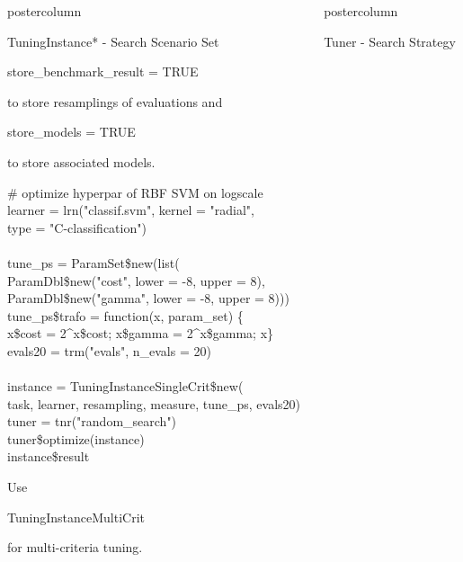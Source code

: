 \documentclass{beamer}
\newlength{\columnheight} %
\newcommand{\codeinline}[1]{\begin{codeboxinline}#1\end{codeboxinline}}
\begin{document}
\begin{frame}[fragile]{}
\begin{columns}
\begin{column}{.245\textwidth}
\begin{beamercolorbox}[center]{postercolumn}
\begin{minipage}{.98\textwidth}
{\begin{myblock}{TuningInstance* - Search Scenario}
							Set \codeinline{store\_benchmark\_result = TRUE} to store resamplings of evaluations and \codeinline{store\_models = TRUE} to store associated models.\\
							\begin{codeboxexample}
								{\scriptsize
									\# optimize hyperpar of RBF SVM on logscale\\
									learner = lrn("classif.svm", kernel = "radial",\\
									\hspace*{1ex} type = "C-classification")\\
									\\
									tune\_ps = ParamSet\$new(list(\\
									\hspace*{1ex} ParamDbl\$new("cost", lower = -8, upper = 8),\\
									\hspace*{1ex} ParamDbl\$new("gamma", lower = -8, upper = 8)))\\
									tune\_ps\$trafo = function(x, param\_set) \{\\
									\hspace*{1ex} x\$cost = 2\textasciicircum x\$cost; x\$gamma = 2\textasciicircum x\$gamma; x\}\\
									evals20 = trm("evals", n\_evals = 20)\\
									\\
									instance = TuningInstanceSingleCrit\$new(\\
									\hspace*{1ex} task, learner, resampling, measure, tune\_ps, evals20)\\
									tuner = tnr("random\_search")\\
									tuner\$optimize(instance)\\
									instance\$result}
							\end{codeboxexample}
							Use \codeinline{TuningInstanceMultiCrit} for multi-criteria tuning.
						\end{myblock}
						\vfill}
				\end{minipage}
			\end{beamercolorbox}
		\end{column}
		\begin{column}{.245\textwidth}
			\begin{beamercolorbox}[center]{postercolumn}
				\begin{minipage}{.98\textwidth}
					\parbox[t][\columnheight]{\textwidth}{
						\begin{myblock}{Tuner - Search Strategy}

\end{myblock}}
\end{minipage}
\end{beamercolorbox}
\end{column}
\end{columns}
\end{frame}
\end{document}

